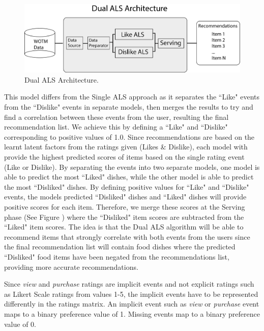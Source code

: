 \begin{figure}
\centering
\includegraphics[scale=0.4]{recent_images/Dual_ALS_architecture.png}
\caption{Dual ALS Architecture.}
\label{fig:dual_architecture}
\end{figure}


This model differs from the Single ALS approach as it separates the ``Like" events from the ``Dislike" events in separate models, then merges the results to try and find a correlation between these events from the user, resulting the final recommendation list. We achieve this by defining a ``Like" and ``Dislike" corresponding to positive values of 1.0. Since recommendations are based on the learnt latent factors from the ratings given (Likes \& Dislike), each model with provide the highest predicted scores of items based on the single rating event (Like or Dislike). By separating the events into two separate models, one model is able to predict the most ``Liked" dishes, while the other model is able to predict the most ``Disliked" dishes. By defining positive values for ``Like" and ``Dislike" events, the models predicted ``Disliked" dishes and ``Liked" dishes will provide positive scores for each item. Therefore, we merge these scores at the Serving phase (See Figure ) where the ``Disliked" item scores are subtracted from the ``Liked" item scores. The idea is that the Dual ALS algorithm will be able to recommend items that strongly correlate with both events from the users since the final recommendation list will contain food dishes where the predicted ``Disliked" food items have been negated from the recommendations list, providing more accurate recommendations.


Since \textit{view} and \textit{purchase} ratings are implicit events and not explicit ratings such as Likert Scale ratings from values 1-5, the implicit events have to be represented differently in the ratings matrix. An implicit event such as \textit{view} or \textit{purchase} event maps to a binary preference value of 1. Missing events map to a binary preference value of 0. 

